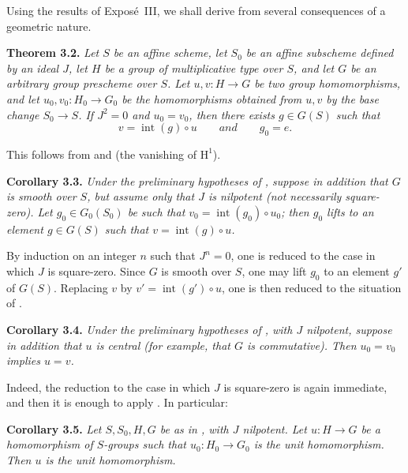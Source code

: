 Using the results of Expos\'e~III, we shall derive from
 several consequences of a geometric
nature.

\medskip
\noindent{}\textbf{Theorem 3.2.}
\textit{Let \(S\) be an affine scheme, let \(S_0\) be an affine subscheme
defined by an ideal \(J\), let \(H\) be a group of multiplicative type
over \(S\), and let \(G\) be an arbitrary group prescheme over \(S\).
Let \(u,v:H\to G\) be two group homomorphisms, and let
\(u_0,v_0:H_0\to G_0\) be the homomorphisms obtained from \(u,v\) by the
base change \(S_0\to S\). If \(J^2=0\) and \(u_0=v_0\), then there exists
\(g\in G(S)\) such that}
\[
  v=\operatorname{int}(g)\circ u
  \qquad\textit{and}\qquad
  g_0=e.
\]

This follows from  and
 (the vanishing of
\(\mathrm H^1\)).

\medskip
\noindent{}\textbf{Corollary 3.3.}
\textit{Under the preliminary hypotheses of
, suppose in addition that \(G\) is
smooth over \(S\), but assume only that \(J\) is nilpotent (not
necessarily square-zero). Let \(g_0\in G_0(S_0)\) be such that
\(v_0=\operatorname{int}(g_0)\circ u_0\); then \(g_0\) lifts to an element
\(g\in G(S)\) such that \(v=\operatorname{int}(g)\circ u\).}

By induction on an integer \(n\) such that \(J^n=0\), one is reduced to
the case in which \(J\) is square-zero. Since \(G\) is smooth over \(S\),
one may lift \(g_0\) to an element \(g'\) of \(G(S)\). Replacing \(v\) by
\(v'=\operatorname{int}(g')\circ u\), one is then reduced to the
situation of .

\medskip
\noindent{}\textbf{Corollary 3.4.}
\textit{Under the preliminary hypotheses of
, with \(J\) nilpotent, suppose in
addition that \(u\) is central (for example, that \(G\) is commutative).
Then \(u_0=v_0\) implies \(u=v\).}

Indeed, the reduction to the case in which \(J\) is square-zero is again
immediate, and then it is enough to apply
. In particular:

\medskip
\noindent{}\textbf{Corollary 3.5.}
\textit{Let \(S,S_0,H,G\) be as in
, with \(J\) nilpotent. Let
\(u:H\to G\) be a homomorphism of \(S\)-groups such that
\(u_0:H_0\to G_0\) is the unit homomorphism. Then \(u\) is the unit
homomorphism.}

